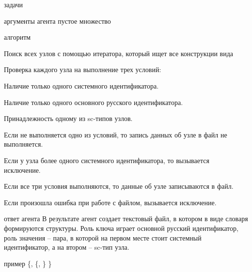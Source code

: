 

\begin{scnrelfromvector}{задачи}
\end{scnrelfromvector}
\begin{scnrelfrom}{аргументы агента}
	{пустое множество}
\end{scnrelfrom}
\begin{scnrelfrom}{алгоритм}
{
	\begin{scnitemize}
		\item Поиск всех узлов с помощью итератора, который ищет все конструкции вида 
		\item Проверка каждого узла на выполнение трех условий:
			\begin{scnitemizeii}
				\item Наличие только одного системного идентификатора.
				\item Наличие только одного основного русского идентификатора.
				\item Принадлежность одному из sc-типов узлов.
			\end{scnitemizeii}
		\item Если не выполняется одно из условий, то запись данных об узле в файл не выполняется. 
		\item Если у узла более одного системного идентификатора, то вызывается исключение.
		\item Если все три условия выполняются, то данные об узле записываются в файл.
		\item Если произошла ошибка при работе с файлом, вызывается исключение.
	\end{scnitemize}
}
\end{scnrelfrom}
\begin{scnrelfrom}{ответ агента}
    {В результате агент создает текстовый файл, в котором в виде словаря формируются структуры.
     Роль ключа играет основной русский идентификатор, роль значения -- пара, в которой на первом месте стоит системный идентификатор, а на втором -- sc-тип узла.}
\end{scnrelfrom}
\begin{scnindent}
	\begin{scnrelfrom}{пример}
	{\{, \{, \} \}}
	\end{scnrelfrom}
\end{scnindent}
